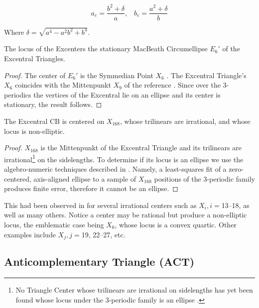 \begin{equation*}
 a_e=\frac{{b}^{2}+\delta}{a},\;\;\; 
 b_e=\frac{{a}^{2}+\delta}{b}
\end{equation*}

Where $\delta=\sqrt{a^4-a^2 b^2+b^4}$. 

\begin{proposition}
The locus of the Excenters the stationary MacBeath Circumellipse $E_6'$ \cite{mw} of the Excentral Triangles.
\end{proposition}

\begin{proof}
The center of $E_6'$ is the Symmedian Point $X_6$ \cite[MacBeath Circumconic]{mw}. The Excentral Triangle's $X_6$ coincides with the Mittenpunkt $X_9$ of the reference \cite{etc}. Since over the 3-periodics the vertices of the Excentral lie on an ellipse and its center is stationary, the result follows.
\end{proof}

\begin{proposition}
The Excentral CB is centered on $X_{168}$, whose trilinears are irrational, and whose locus is non-elliptic.
\end{proposition}

\begin{proof}
$X_{168}$ is the Mittenpunkt of the Excentral Triangle \cite{etc} and its trilinears are irrational\footnote{No Triangle Center whose trilinears are irrational on sidelengths has yet been found whose locus under the 3-periodic family is an ellipse \cite{garcia2020-ellipses}.} on the sidelengths. To determine if its locus is an ellipse we use the algebro-numeric techniques described in \cite{garcia2020-ellipses}. Namely, a least-squares fit of a zero-centered, axis-aligned ellipse to a sample of $X_{168}$ positions of the 3-periodic family produces finite error, therefore it cannot be an ellipse.
\end{proof}

This had been observed in \cite{garcia2020-ellipses} for several irrational centers such as $X_i,i=$13--18, as well as many others. Notice a center may be rational but produce a non-elliptic locus, the emblematic case being $X_6$, whose locus is a convex quartic. Other examples include $X_j,j=$19, 22--27, etc.

\subsection{Anticomplementary Triangle (ACT)}
\label{sec:cb_act}

